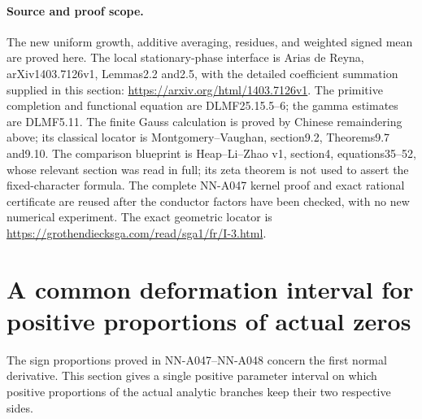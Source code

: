 \paragraph{Source and proof scope.}
The new uniform growth, additive averaging, residues,
and weighted signed mean are proved here.
The local stationary-phase interface is Arias de Reyna,
arXiv1403.7126v1, Lemmas2.2 and2.5, with the detailed
coefficient summation supplied in this section:
\url{https://arxiv.org/html/1403.7126v1}.
The primitive completion and functional equation are
DLMF25.15.5--6; the gamma estimates are DLMF5.11.
The finite Gauss calculation is proved by Chinese
remaindering above; its classical locator is
Montgomery--Vaughan, section9.2, Theorems9.7 and9.10.
The comparison blueprint is Heap--Li--Zhao v1,
section4, equations35--52, whose relevant section
was read in full; its zeta theorem is not used to
assert the fixed-character formula.
The complete NN-A047 kernel proof and exact rational
certificate are reused after the conductor factors
have been checked, with no new numerical experiment.
The exact geometric locator is
\url{https://grothendiecksga.com/read/sga1/fr/I-3.html}.




\section{A common deformation interval for positive proportions of actual zeros}
\label{sec:A049-common-time}

The sign proportions proved in NN-A047--NN-A048 concern the
first normal derivative. This section gives a single positive
parameter interval on which positive proportions of the actual
analytic branches keep their two respective sides.

